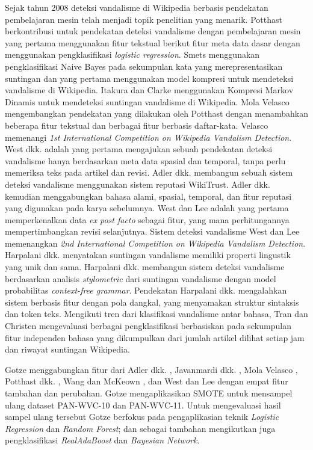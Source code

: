 Sejak tahun 2008 deteksi vandalisme di Wikipedia berbasis pendekatan pembelajaran mesin telah menjadi topik penelitian yang menarik.
Potthast \cite{potthast2008automatic} berkontribusi untuk pendekatan deteksi
vandalisme dengan pembelajaran mesin yang pertama menggunakan fitur tekstual
berikut fitur meta data dasar dengan menggunakan pengklasifikasi
\textit{logistic regression}.
Smets \cite{smets08automaticvandalism} menggunakan pengklasifikasi Naive Bayes
pada sekumpulan kata yang merepresentasikan suntingan dan yang pertama
menggunakan model kompresi untuk mendeteksi vandalisme di Wikipedia.
Itakura dan Clarke \cite{itakura2009using} menggunakan Kompresi Markov Dinamis
untuk mendeteksi suntingan vandalisme di Wikipedia.
Mola Velasco \cite{mola2012wikipedia} mengembangkan pendekatan yang dilakukan
oleh Potthast \cite{potthast2008automatic} dengan menambahkan beberapa fitur
tekstual dan berbagai fitur berbasis daftar-kata.
Velasco memenangi \textit{1st International Competition on Wikipedia Vandalism
Detection}.  West dkk. \cite{west2011multilingual} adalah yang pertama
mengajukan sebuah pendekatan deteksi vandalisme hanya berdasarkan meta data
spasial dan temporal, tanpa perlu memeriksa teks pada artikel dan revisi.
Adler dkk. \cite{adler2010detecting} membangun sebuah sistem deteksi vandalisme
menggunakan sistem reputasi WikiTrust.
Adler dkk. \cite{adler2011wikipedia} kemudian menggabungkan bahasa alami,
spasial, temporal, dan fitur reputasi yang digunakan pada karya sebelumnya.
West dan Lee \cite{west2011multilingual} adalah yang pertama memperkenalkan
data \textit{ex post facto} sebagai fitur, yang mana perhitungannya
mempertimbangkan revisi selanjutnya.
Sistem deteksi vandalisme West dan Lee memenangkan \textit{2nd International
Competition on Wikipedia Vandalism Detection}.
Harpalani dkk. \cite{harpalani2011language} menyatakan suntingan vandalisme
memiliki properti lingustik yang unik dan sama.
Harpalani dkk. membangun sistem deteksi vandalisme berdasarkan analisis
\textit{stylometric} dari suntingan vandalisme dengan model probabilitas
\textit{context-free grammar}.
Pendekatan Harpalani dkk. mengalahkan sistem berbasis fitur dengan pola
dangkal, yang menyamakan struktur sintaksis dan token teks.
Mengikuti tren dari klasifikasi vandalisme antar bahasa, Tran dan Christen
\cite{tran2013cross} mengevaluasi berbagai pengklasifikasi berbasiskan pada
sekumpulan fitur independen bahasa yang dikumpulkan dari jumlah artikel dilihat
setiap jam dan riwayat suntingan Wikipedia.

Gotze \cite{gotze2014advanced} menggabungkan fitur dari Adler dkk.
\cite{adler2011wikipedia}, Javanmardi dkk. \cite{javanmardi2011vandalism}, Mola
Velasco \cite{mola2012wikipedia}, Potthast dkk. \cite{potthast2008automatic},
Wang dan McKeown \cite{wang2010got}, dan West dan Lee
\cite{west2011multilingual} dengan empat fitur tambahan dan perubahan.
Gotze mengaplikasikan SMOTE untuk mensampel ulang dataset PAN-WVC-10 dan
PAN-WVC-11.
Untuk mengevaluasi hasil sampel ulang tersebut Gotze berfokus pada
pengaplikasian teknik \textit{Logistic Regression} dan \textit{Random Forest};
dan sebagai tambahan mengikutkan juga pengklasifikasi \textit{RealAdaBoost} dan
\textit{Bayesian Network}.

